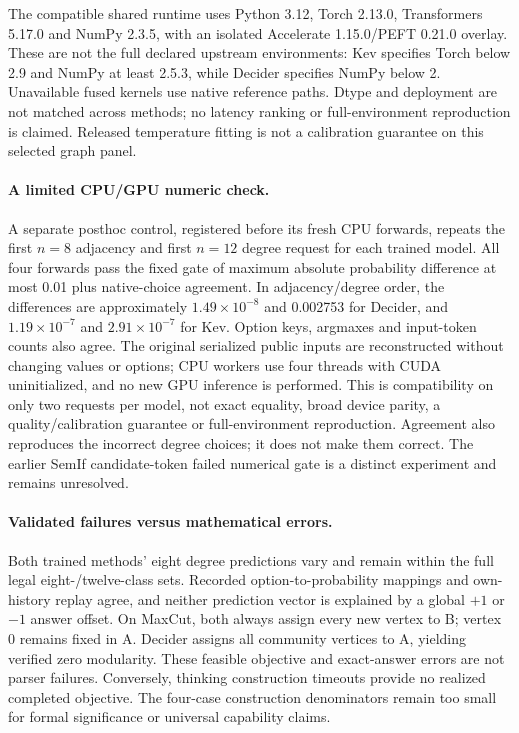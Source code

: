 \documentclass[11pt]{article}
\begin{document}
The compatible shared runtime uses Python 3.12, Torch 2.13.0, Transformers
5.17.0 and NumPy 2.3.5, with an isolated Accelerate 1.15.0/PEFT 0.21.0 overlay.
These are not the full declared upstream environments: Kev specifies
Torch below 2.9 and NumPy at least 2.5.3, while Decider specifies NumPy below 2.
Unavailable fused kernels use native reference paths. Dtype and deployment
are not matched across methods; no latency ranking or full-environment
reproduction is claimed. Released temperature fitting is not a calibration
guarantee on this selected graph panel.

\paragraph{A limited CPU/GPU numeric check.}
A separate posthoc control, registered before its fresh CPU forwards, repeats
the first $n=8$ adjacency and first $n=12$ degree request for each trained model.
All four forwards pass the fixed gate of maximum absolute probability
difference at most 0.01 plus native-choice agreement. In adjacency/degree order,
the differences are approximately $1.49\times10^{-8}$ and 0.002753 for Decider,
and $1.19\times10^{-7}$ and $2.91\times10^{-7}$ for Kev. Option keys, argmaxes
and input-token counts also agree. The original serialized public inputs are
reconstructed without changing values or options; CPU workers use four threads
with CUDA uninitialized, and no new GPU inference is performed.
This is compatibility on only two requests per model, not exact equality,
broad device parity, a quality/calibration guarantee or full-environment reproduction.
Agreement also reproduces the incorrect degree choices; it does not make
them correct. The earlier SemIf candidate-token failed numerical gate is
a distinct experiment and remains unresolved.

\paragraph{Validated failures versus mathematical errors.}
Both trained methods' eight degree predictions vary and remain within the
full legal eight-/twelve-class sets. Recorded option-to-probability mappings
and own-history replay agree, and neither prediction vector is explained by
a global $+1$ or $-1$ answer offset. On MaxCut, both always assign every new
vertex to B; vertex 0 remains fixed in A. Decider assigns all community
vertices to A, yielding verified zero modularity. These feasible objective
and exact-answer errors are not parser failures. Conversely, thinking
construction timeouts provide no realized completed objective. The four-case
construction denominators remain too small for formal significance or
universal capability claims.
\end{document}
